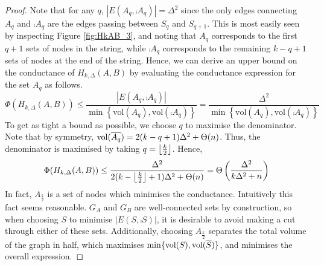 \begin{proof}
	Note that for any $q$, $|E(A_q,\comp{A_q})| = \Delta^2$ since the only edges connecting $A_q$ and $\comp{A_q}$ are the edges passing between $S_q$ and $S_{q+1}$. This is most easily seen by inspecting Figure \ref{fig:HkAB_3}, and noting that $A_q$ corresponds to the first $q + 1$ sets of nodes in the string, while $\comp{A_q}$ corresponds to the remaining $k - q + 1$ sets of nodes at the end of the string.
	Hence, we can derive an upper bound on the conductance of $H_{k, \Delta}(A, B)$ by evaluating the conductance expression for the set $A_q$ as follows.
	$$
		\Phi(H_{k, \Delta}(A, B)) 
		\leq \frac{|E(A_q, \comp{A_q})|}{\min \left\{ \text{vol}(A_q), \text{vol}(\comp{A_q}) \right\} } 
		= \frac{\Delta^2}{\min \left\{ \text{vol}(A_q), \text{vol}(\comp{A_q}) \right\}}
	$$	
	To get as tight a bound as possible, we choose $q$ to maximise the denominator. Note that by symmetry, $\vol(\comp{A_q}) = 2(k - q + 1)\Delta^2 + \Theta(n)$. Thus, the denominator is maximised by taking $q = \floor*{\frac{k}{2}}$. Hence,
	$$
		\Phi(H_{k, \Delta}(A, B)) 
		\leq \frac{\Delta^2}{2(k - \floor*{\frac{k}{2}} + 1)\Delta^2 + \Theta(n)}
		= \Theta\lb\frac{\Delta^2}{k\Delta^2 + n}\rb
	$$
	In fact, $A_\frac{k}{2}$ is a set of nodes which minimises the conductance. Intuitively this fact seems reasonable. $G_A$ and $G_B$ are well-connected sets by construction, so when choosing $S$ to minimise $|E(S, \comp{S})|$, it is desirable to avoid making a cut through either of these sets. Additionally, choosing $A_\frac{k}{2}$ separates the total volume of the graph in half, which maximises $\min \{\vol(S),\vol(\comp{S})\}$, and minimises the overall expression. 
	

\end{proof}
